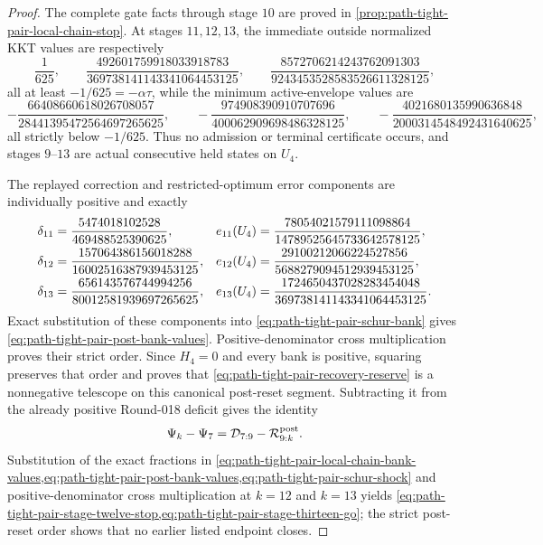 \begin{proof}
The complete gate facts through stage $10$ are proved in
\cref{prop:path-tight-pair-local-chain-stop}.  At stages $11,12,13$, the
immediate outside normalized KKT values are respectively
\begin{equation*}
 \frac1{625},\qquad
 \frac{492601759918033918783}{369738141143341064453125},\qquad
 \frac{8572706214243762091303}{9243453528583526611328125},
\end{equation*}
all at least $-1/625=-\alpha\tau$, while the minimum active-envelope values
are
\begin{equation*}
 -\frac{66408660618026708057}{28441395472564697265625},\qquad
 -\frac{974908390910707696}{400062909698486328125},\qquad
 -\frac{4021680135990636848}{2000314548492431640625},
\end{equation*}
all strictly below $-1/625$.  Thus no admission or terminal certificate
occurs, and stages $9$--$13$ are actual consecutive held states on $U_4$.

The replayed correction and restricted-optimum error components are
individually positive and exactly
\begin{align}
 \delta_{11}&=\frac{5474018102528}{469488525390625},
 &e_{11}(U_4)&=\frac{78054021579111098864}{14789525645733642578125},
 \notag\\
 \delta_{12}&=\frac{157064386156018288}{16002516387939453125},
 &e_{12}(U_4)&=\frac{29100212066224527856}{5688279094512939453125},
 \notag\\
 \delta_{13}&=\frac{656143576744994256}{80012581939697265625},
 &e_{13}(U_4)&=\frac{1724650437028283454048}{369738141143341064453125}.
 \label{eq:path-tight-pair-post-components}
\end{align}
Exact substitution of these components into
\cref{eq:path-tight-pair-schur-bank} gives
\cref{eq:path-tight-pair-post-bank-values}.  Positive-denominator cross
multiplication proves their strict order.  Since $H_4=0$ and every bank is
positive, squaring preserves that order and proves that
\cref{eq:path-tight-pair-recovery-reserve} is a nonnegative telescope on
this canonical post-reset segment.  Subtracting it from the already positive
Round-018 deficit gives the identity
\begin{equation*}
 \Psi_k-\Psi_7=\mathcal D_{7:9}-\mathcal R_{9:k}^{\rm post}.
\end{equation*}
Substitution of the exact fractions in
\cref{eq:path-tight-pair-local-chain-bank-values,eq:path-tight-pair-post-bank-values,eq:path-tight-pair-schur-shock}
and positive-denominator cross multiplication at $k=12$ and $k=13$ yields
\cref{eq:path-tight-pair-stage-twelve-stop,eq:path-tight-pair-stage-thirteen-go};
the strict post-reset order shows that no earlier listed endpoint closes.


\end{proof}
